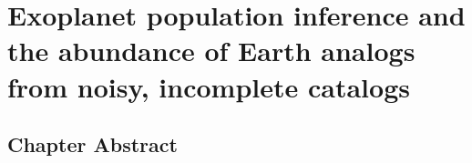 \newcommand{\True}{\foreign{True}}
\newcommand{\Truth}{\foreign{Truth}}

\newcommand{\densityunit}{{\ensuremath{\mathrm{nat}^{-2}}}}
\newcommand{\rate}{\ensuremath{\Gamma}}
\newcommand{\ratepar}{{\ensuremath{\theta}}}
\newcommand{\ratepars}{{\ensuremath{\bvec{\ratepar}}}}
\newcommand{\obs}[1]{\ensuremath{\hat{#1}}}
\newcommand{\radius}{\ensuremath{R}}
\newcommand{\period}{\ensuremath{P}}
\newcommand{\completeness}{{\ensuremath{Q_\mathrm{c}}}}
\newcommand{\transitprob}{{\ensuremath{Q_\mathrm{t}}}}
\renewcommand{\data}{{\ensuremath{\bvec{x}}}}
\newcommand{\entry}{{\ensuremath{\bvec{w}}}}
\newcommand{\catalog}{{\ensuremath{\bvec{\entry}}}}
\newcommand{\interim}{{\ensuremath{\bvec{\alpha}}}}
\newcommand{\binarea}{{\ensuremath{\Delta}}}
\newcommand{\bincenter}{{\ensuremath{\bvec{x}}}}
\newcommand{\binheight}{{\ensuremath{w}}}
\newcommand{\binheights}{{\ensuremath{\bvec{\binheight}}}}
\newcommand{\mean}{{\ensuremath{\mu}}}
\newcommand{\smooth}{{\ensuremath{\lambda}}}
\newcommand{\smoothpars}{{\ensuremath{\bvec{\smooth}}}}
\newcommand{\cov}{{\ensuremath{\mathrm{K}}}}
\newcommand{\modela}{\emph{Catalog A}}
\newcommand{\modelb}{\emph{Catalog B}}
\newcommand{\gammaearth}{{\ensuremath{\rate_\oplus}}}
\newcommand{\resultsurl}{\url{http://dx.doi.org/10.5281/zenodo.11507}}


\chapter{Exoplanet population inference and the abundance
         of Earth analogs from noisy, incomplete catalogs}

\section{Chapter Abstract}

